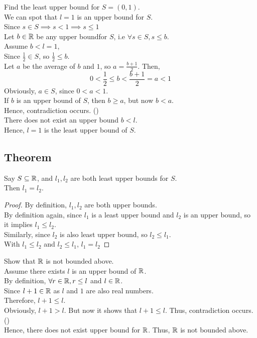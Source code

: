 \documentclass[a4paper]{article}
\begin{document}
\begin{eg}
Find the least upper bound for $S = (0, 1)$.\\
We can spot that $l = 1$ is an upper bound for $S$.\\
Since $s \in S \implies s < 1 \implies s \leq 1$\\
Let $b \in \mathbb{R}$ be any upper boundfor $S$, i.e $\forall s \in S, s \leq b$.\\
Assume $b < l = 1$,\\
Since $\frac{1}{2} \in S$, so $\frac{1}{2} \leq b$.\\
Let $a$ be the average of $b$ and $1$, so $a = \frac{b+1}{2}$. Then,
$$0 < \frac{1}{2} \leq b < \frac{b+1}{2} = a < 1$$
Obviously, $a \in S$, since $0 < a < 1$.\\
If $b$ is an upper bound of $S$, then $b \geq a$, but now $b < a$.\\
Hence, contradiction occurs. (\contradiction)\\
There does not exist an upper bound $b < l$.\\
Hence, $l = 1$ is the least upper bound of $S$.
\end{eg}

\subsection{Theorem}
\begin{nthm}
Say $S \subseteq \mathbb{R}$, and $l_1, l_2$ are both least upper bounds for $S$.\\
Then $l_1 = l_2$.
\end{nthm}
\begin{proof}
By definition, $l_1, l_2$ are both upper bounds.\\
By definition again, since $l_1$ is a least upper bound and $l_2$ is an upper bound, so it implies $l_1 \leq l_2$.\\
Similarly, since $l_2$ is also least upper bound, so $l_2 \leq l_1$.\\
With $l_1 \leq l_2$ and $l_2 \leq l_1$, $l_1 = l_2$
\end{proof}

\begin{eg}
Show that $\mathbb{R}$ is not bounded above.\\
Assume there exists $l$ is an upper bound of $\mathbb{R}$.\\
By definition, $\forall r \in \mathbb{R}, r \leq l$ and $l \in \mathbb{R}$.\\
Since $l + 1 \in \mathbb{R}$ as $l$ and $1$ are also real numbers.\\
Therefore, $l+1 \leq l$.\\
Obviously, $l+1 > l$. But now it shows that $l+1 \leq l$. Thus, contradiction occurs. (\contradiction)\\
Hence, there does not exist upper bound for $\mathbb{R}$. Thus, $\mathbb{R}$ is not bounded above.
\end{eg}
\end{document}
